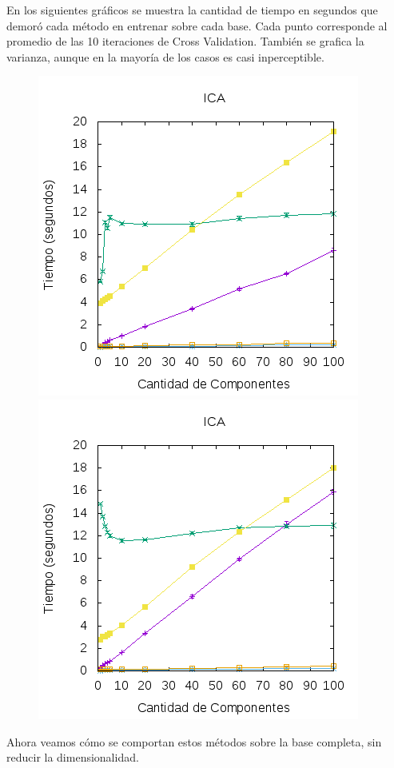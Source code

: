 \documentclass[10pt, a4paper]{article}
\begin{document}
En los siguientes gráficos se muestra la cantidad de tiempo en segundos que demoró cada método en entrenar sobre cada base. Cada punto corresponde al promedio de las 10 iteraciones de Cross Validation. También se grafica la varianza, aunque en la mayoría de los casos es casi inperceptible.

\begin{figure}[H]
\includegraphics[scale=0.6]{../src/data/tmica.png}
\includegraphics[scale=0.6]{../src/data/tmpca.png}
\end{figure}

Ahora veamos cómo se comportan estos métodos sobre la base completa, sin reducir la dimensionalidad.
\end{document}
